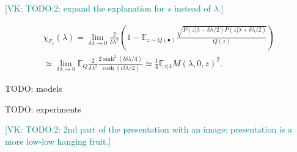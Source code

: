 \documentclass[
  american,aps,pra,reprint,floatfix,nofootinbib,superscriptaddress
]{revtex4-2}
\newcommand{\VK}[1]{\textcolor{teal}{[VK: #1]}}
\begin{document}
\VK{TODO:2: expand the explanation for $s$ instead of $\lambda$.}

    \begin{multline*}
      \chi_{F_c}(\lambda) = \lim_{\delta \lambda\to 0} \frac2{\delta \lambda^2} \left(1 - \mathbb{E}_{z\sim Q(\bullet)} \frac{\sqrt{P(z|\lambda-\delta \lambda/2)P(z|\lambda+\delta \lambda/2)}}{Q(z)}\right)
      \\ \simeq \lim_{\delta \lambda\to 0} \mathbb{E}_{Q}\frac2{\delta \lambda^2}\frac{2\sinh^2(l\delta \lambda/4)}{\cosh(l\delta \lambda/2)} \simeq \frac14 \mathbb{E}_{z|\lambda} M(\lambda, 0, z)^2.
    \end{multline*}

TODO: models

TODO: experiments

\VK{TODO:2: 2nd part of the presentation with an image: presentation is a more low-low hanging fruit.}



\end{document}
